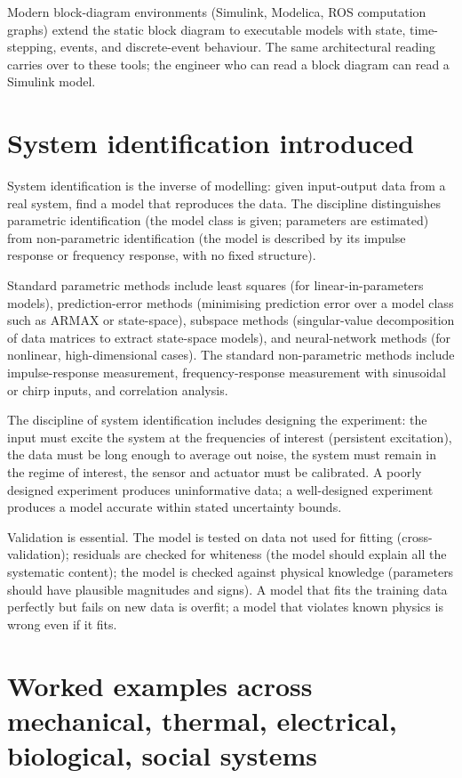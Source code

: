 Modern block-diagram environments (Simulink, Modelica, ROS computation graphs) extend the static block diagram to executable models with state, time-stepping, events, and discrete-event behaviour. The same architectural reading carries over to these tools; the engineer who can read a block diagram can read a Simulink model.

\section{System identification introduced}

System identification is the inverse of modelling: given input-output data from a real system, find a model that reproduces the data. The discipline distinguishes parametric identification (the model class is given; parameters are estimated) from non-parametric identification (the model is described by its impulse response or frequency response, with no fixed structure).

Standard parametric methods include least squares (for linear-in-parameters models), prediction-error methods (minimising prediction error over a model class such as ARMAX or state-space), subspace methods (singular-value decomposition of data matrices to extract state-space models), and neural-network methods (for nonlinear, high-dimensional cases). The standard non-parametric methods include impulse-response measurement, frequency-response measurement with sinusoidal or chirp inputs, and correlation analysis.

The discipline of system identification includes designing the experiment: the input must excite the system at the frequencies of interest (persistent excitation), the data must be long enough to average out noise, the system must remain in the regime of interest, the sensor and actuator must be calibrated. A poorly designed experiment produces uninformative data; a well-designed experiment produces a model accurate within stated uncertainty bounds.

Validation is essential. The model is tested on data not used for fitting (cross-validation); residuals are checked for whiteness (the model should explain all the systematic content); the model is checked against physical knowledge (parameters should have plausible magnitudes and signs). A model that fits the training data perfectly but fails on new data is overfit; a model that violates known physics is wrong even if it fits.

\section{Worked examples across mechanical, thermal, electrical, biological, social systems}

